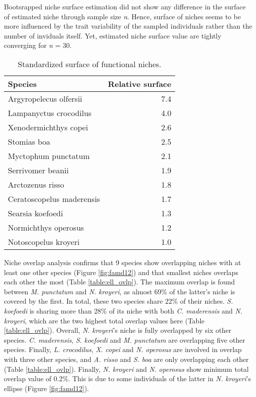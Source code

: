 Bootsrapped niche surface estimation did not show any difference in the surface of estimated niche through sample size \textit{n}. Hence, surface of niches seems to be more influenced by the trait variability of the sampled individuals rather than the number of inviduals itself. Yet, estimated niche surface value are tightly converging for \textit{n} = 30. 

\begin{table}[!htbp]
\centering
\caption[Standardized surface of functional niches]{Standardized surface of functional niches.}
\label{table:sp_surface}
\begin{adjustbox}{max width=1.1\textwidth,center}
\begin{tabular}{lr}
  \hline
Species & Relative surface \\ 
  \hline
Argyropelecus olfersii & 7.4 \\ 
  Lampanyctus crocodilus & 4.0 \\ 
  Xenodermichthys copei & 2.6 \\ 
  Stomias boa & 2.5 \\ 
  Myctophum punctatum & 2.1 \\ 
  Serrivomer beanii & 1.9 \\ 
  Arctozenus risso & 1.8 \\ 
  Ceratoscopelus maderensis & 1.7 \\ 
  Searsia koefoedi & 1.3 \\ 
  Normichthys operosus & 1.2 \\ 
  Notoscopelus kroyeri & 1.0 \\ 
   \hline
\end{tabular}
\end{adjustbox}
\end{table}

Niche overlap analysis confirms that 9 species show overlapping niches with at least one other species (Figure \ref{fig:famd12}) and that smallest niches overlaps each other the most (Table \ref{table:ell_ovlp}). The maximum  overlap is found between \textit{M. punctatum} and \textit{N. kroyeri}, as almost 69\% of the latter's niche is covered by the first. In total, these two species share 22\% of their niches. \textit{S. koefoedi} is sharing more than 28\% of its niche with both \textit{C. maderensis} and \textit{N. kroyeri}, which are the two highest total overlap values here (Table \ref{table:ell_ovlp}). Overall, \textit{N. kroyeri}'s niche is fully overlapped by six other species. \textit{C. maderensis}, \textit{S. koefoedi} and \textit{M. punctatum} are overlapping five other species. Finally, \textit{L. crocodilus}, \textit{X. copei} and \textit{N. operosus} are involved in overlap with three other species, and \textit{A. risso} and \textit{S. boa} are only overlapping each other (Table \ref{table:ell_ovlp}). Finally, \textit{N. kroyeri} and \textit{N. operosus} show minimum total overlap value of 0.2\%. This is due to some individuals of the latter in \textit{N. kroyeri}'s ellipse (Figure \ref{fig:famd12}). 

